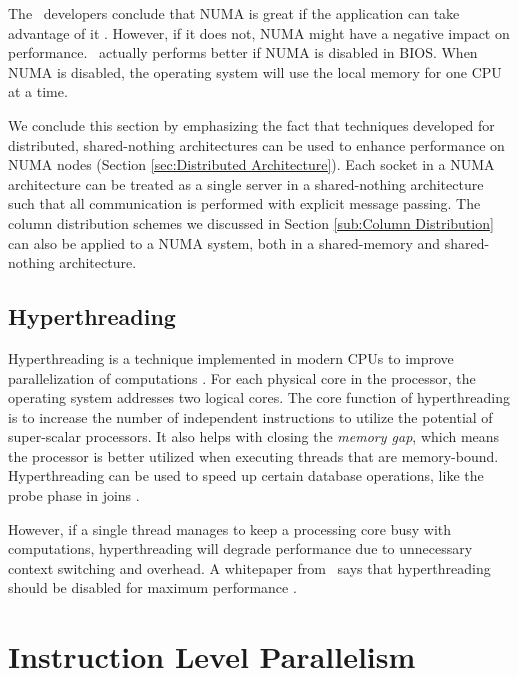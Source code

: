 The \qlikview~developers conclude that NUMA is great if the application can take advantage of it \cite{Qlik2013-an}. However, if it does not, NUMA might have a negative impact on performance. \qlikview~actually performs better if NUMA is disabled in BIOS. When NUMA is disabled, the operating system will use the local memory for one CPU at a time.

We conclude this section by emphasizing the fact that techniques developed for distributed, shared-nothing architectures can be used to enhance performance on NUMA nodes \cite{Mukherjee2015-ul} (Section \ref{sec:Distributed Architecture}). Each socket in a NUMA architecture can be treated as a single server in a shared-nothing architecture such that all communication is performed with explicit message passing. The column distribution schemes we discussed in Section \ref{sub:Column Distribution} can also be applied to a NUMA system, both in a shared-memory and shared-nothing architecture.

\subsection{Hyperthreading}
\label{sub:Hyperthreading}
Hyperthreading is a technique implemented in modern CPUs to improve parallelization of computations \cite{Wikipedia_contributors2015-yx}. For each physical core in the processor, the operating system addresses two logical cores. The core function of hyperthreading is to increase the number of independent instructions to utilize the potential of super-scalar processors. It also helps with closing the \textit{memory gap}, which means the processor is better utilized when executing threads that are memory-bound. Hyperthreading can be used to speed up certain database operations, like the probe phase in joins \cite{Barber2014-ey}.

However, if a single thread manages to keep a processing core busy with computations, hyperthreading will degrade performance due to unnecessary context switching and overhead. A whitepaper from \qlikview~says that hyperthreading should be disabled for maximum performance \cite{Qlik2011-yc}.

\section{Instruction Level Parallelism}
\label{sec:Instruction Level Parallelism}


